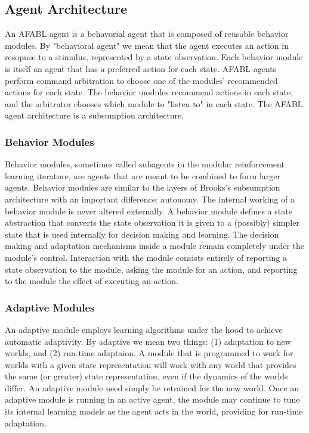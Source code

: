 \subsection{Agent Architecture}

An AFABL agent is a behavorial agent that is composed of reusable
behavior modules.  By "behavioral agent" we mean that the agent
executes an action in resopnse to a stimulus, represented by a state
observation.  Each behavior module is itself an agent that has a
preferred action for each state.  AFABL agents perform command
arbitration to choose one of the modules' recommended actions for each
state.  The behavior modules recommend actions in each state, and the
arbitrator chooses which module to "listen to" in each state.  The
AFABL agent architecture is a subsumption architecture.

\subsubsection{Behavior Modules}

Behavior modules, sometimes called subagents in the modular
reinforcement learning iterature, are agents that are meant to be
combined to form larger agents.  Behavior modules are similar to the
layers of Brooks's subsumption architecture with an important
difference: autonomy.  The internal working of a behavior module is
never altered externally.  A behavior module defines a state
abstraction that converts the state observation it is given to a
(possibly) simpler state that is used internally for decision making
and learning.  The decision making and adaptation mechanisms inside a
module remain completely under the module's control.  Interaction with
the module consists entirely of reporting a state observation to the
module, asking the module for an action, and reporting to the module
the effect of executing an action.



\subsubsection{Adaptive Modules}

An adaptive module employs learning algorithms under the hood to
achieve automatic adaptivity.  By adaptive we mean two things: (1)
adaptation to new worlds, and (2) run-time adaptaion.  A module that
is programmed to work for worlds with a given state representation
will work with any world that provides the same (or greater) state
representation, even if the dynamics of the worlds differ.  An
adaptive module need simply be retrained for the new world.  Once an
adaptive module is running in an active agent, the module may continue
to tune its internal learning models as the agent acts in the world,
providing for run-time adaptation.

